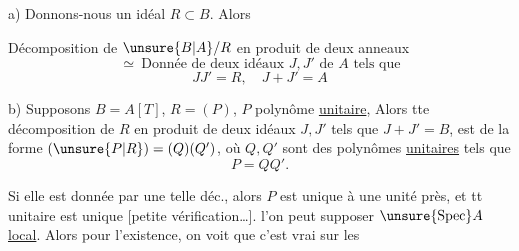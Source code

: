 a) Donnons-nous un idéal $R\subset B$. Alors

Décomposition de $\unsure{B|A}/R$ en produit de deux anneaux
\[
\simeq\ \text{Donnée de deux idéaux }J,J'\text{ de }A\text{ tels que}
\]
\[
JJ'=R,\quad J+J'=A
\]
\margin{[Car $J+J'=A\Rightarrow JJ'=J\cap J'$]}

b) Supposons $B=A[T]$,  $R=(P)$, $P$ polynôme \uline{unitaire}, Alors tte décomposition de $R$ en produit de deux idéaux $J,J'$ tels que $J+J'=B$, est  de la forme $(\unsure{P|R})=(Q)(Q')$, où $Q,Q'$ sont des polynômes \uline{unitaires} tels que
\[
P=QQ'.
\]

Si elle est donnée par une telle déc., alors $P$ est unique à une unité près, et tt  unitaire est unique
\deleted{[\unsure{NB.}\quad\unsure{faut}}
[petite vérification\ldots]. 
 
 l'on peut supposer $\unsure{\operatorname{Spec}} A$ \uline{local}. Alors pour l'existence, on voit que c'est vrai sur les
